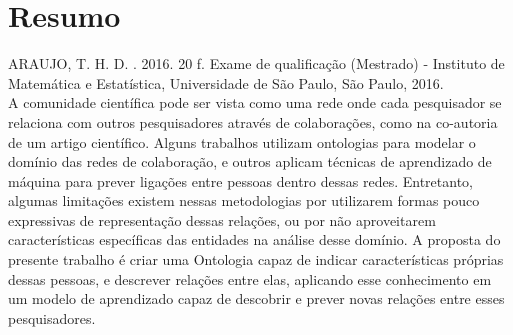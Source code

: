 \documentclass[11pt,twoside,a4paper]{book}
\begin{document}
%
%
%
%


\chapter*{Resumo}

\noindent ARAUJO, T. H. D. \textbf{\mydocumenttitle{}}.
2016. 20 f. Exame de qualificação (Mestrado) - Instituto de Matemática e Estatística,
Universidade de São Paulo, São Paulo, 2016.
\\

A comunidade científica pode ser vista como uma rede onde cada pesquisador se relaciona com outros pesquisadores através de colaborações, como na co-autoria de um artigo científico. Alguns trabalhos utilizam ontologias para modelar o domínio das redes de colaboração, e outros aplicam técnicas de aprendizado de máquina para prever ligações entre pessoas dentro dessas redes. Entretanto, algumas limitações existem nessas metodologias por utilizarem formas pouco expressivas de representação dessas relações, ou por não aproveitarem características específicas das entidades na análise desse domínio. A proposta do presente trabalho é criar uma Ontologia capaz de indicar características próprias dessas pessoas, e descrever relações entre elas, aplicando esse conhecimento em um modelo de aprendizado capaz de descobrir e prever novas relações entre esses pesquisadores.
\\
\end{document}
